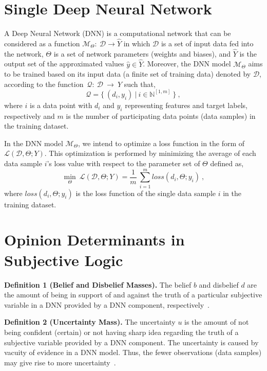 
\appendices
\section{Single Deep Neural Network}
\label{dnn_app}
A Deep Neural Network (DNN) is a computational network that can be considered as a function $\mathcal{M}_\Theta:~\mathcal{D} \rightarrow \hat{Y}$ in which $\mathcal{D}$ is a set of input data fed into the network, $\Theta$ is a set of network parameters (weights and biases), and $\hat{Y}$ is the output set of the approximated values $\hat{y} \in \hat{Y}$. Moreover, the DNN model $\mathcal{M}_{\Theta}$ aims to be trained based on its input data (a finite set of training data) denoted by $\mathcal{D}$, according to the function~$\mathcal{Q}:~\mathcal{D}~\rightarrow~Y$ such that, 
\[
\mathcal{Q} = \{\ (d_{i},y_{i})\ |\ i \in \mathbb{N}^{[1,m]}\ \}\ ,
\]
where $i$ is a data point with $d_{i}$ and $y_{i}$ representing features and target labels, respectively and $m$ is the number of participating data points (data samples) in the training dataset.

In the DNN model $\mathcal{M}_{\Theta}$, we intend to optimize a loss function in the form of $\mathcal{L}(\mathcal{D},\Theta;Y)$. This optimization is performed by minimizing the average of each data sample $i$'s loss value with respect to the parameter set of $\Theta$ defined as, 
\begin{equation}
\min_{\Theta}\ \mathcal{L}(\mathcal{D},\Theta;Y) = \frac{1}{m}\ \sum_{i=1}^{m} loss(d_{i},\Theta;y_{i})\ ,
\label{loss}
\end{equation}
where $loss(d_{i},\Theta;y_{i})$ is the loss function of the single data sample $i$ in the training dataset.

\section{Opinion Determinants in Subjective Logic}
\label{sl_app}
\vspace{.2cm}
\noindent\textbf{Definition 1 (Belief and Disbelief Masses).} The belief $b$ and disbelief $d$ are the amount of being in support of and against the truth of a particular subjective variable in a DNN provided by a DNN component, respectively~\cite{sl}. %

\vspace{.2cm}
\noindent\textbf{Definition 2 (Uncertainty Mass).} The uncertainty $u$ is the amount of not being confident (certain) or not having sharp idea regarding the truth of a subjective variable provided by a DNN component. The uncertainty is caused by vacuity of evidence in a DNN model. Thus, the fewer observations (data samples) may give rise to more uncertainty~\cite{sl}.%

